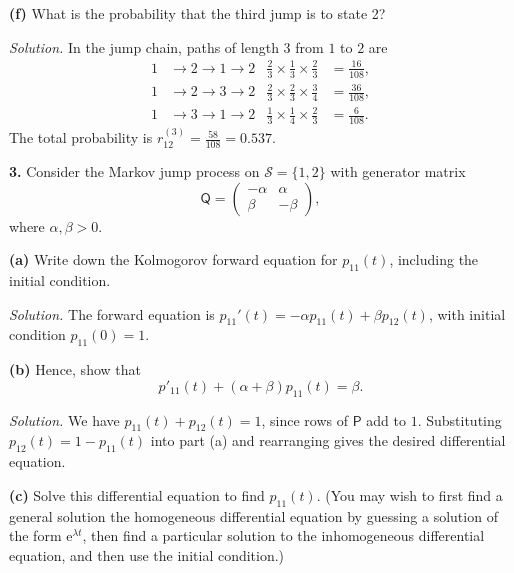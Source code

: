 \documentclass[
  a4paper,
]{article}
\theoremstyle{definition}
\theoremstyle{definition}
\theoremstyle{definition}
\theoremstyle{remark}
\begin{document}
\textbf{(f)} What is the probability that the third jump is to state 2?

\begin{myanswers}
\emph{Solution.}
In the jump chain, paths of length \(3\) from \(1\) to \(2\) are
\begin{align*}
    1 &\to 2 \to 1 \to 2 & \tfrac23 \times \tfrac13 \times \tfrac23 &= \tfrac{16}{108} ,    \\
    1 &\to 2 \to 3 \to 2 & \tfrac23 \times \tfrac23 \times \tfrac34 &=  \tfrac{36}{108} ,   \\
    1 &\to 3 \to 1 \to 2 & \tfrac13 \times \tfrac14 \times \tfrac23 &=  \tfrac{6}{108} .
    \end{align*}
The total probability is \(r_{12}^{(3)} = \frac{58}{108} = 0.537\).

\end{myanswers}

\textbf{3.} Consider the Markov jump process on \(\mathcal S = \{1,2\}\) with generator matrix
\[ \mathsf Q = \begin{pmatrix} -\alpha & \alpha \\ \beta & -\beta \end{pmatrix} , \]
where \(\alpha, \beta > 0\).

\textbf{(a)} Write down the Kolmogorov forward equation for \(p_{11}(t)\), including the initial condition.

\begin{myanswers}
\emph{Solution.}
The forward equation is \(p_{11}'(t) = -\alpha p_{11}(t) + \beta p_{12}(t)\), with initial condition \(p_{11}(0) = 1\).

\end{myanswers}

\textbf{(b)} Hence, show that
\[ p'_{11}(t) + (\alpha + \beta)p_{11}(t) = \beta .  \]

\begin{myanswers}
\emph{Solution.}
We have \(p_{11}(t) + p_{12}(t) = 1\), since rows of \(\mathsf P\) add to \(1\). Substituting \(p_{12}(t) = 1 - p_{11}(t)\) into part (a) and rearranging gives the desired differential equation.

\end{myanswers}

\textbf{(c)} Solve this differential equation to find \(p_{11}(t)\). (You may wish to first find a general solution the homogeneous differential equation by guessing a solution of the form \(\mathrm{e}^{\lambda t}\), then find a particular solution to the inhomogeneous differential equation, and then use the initial condition.)
\end{document}

